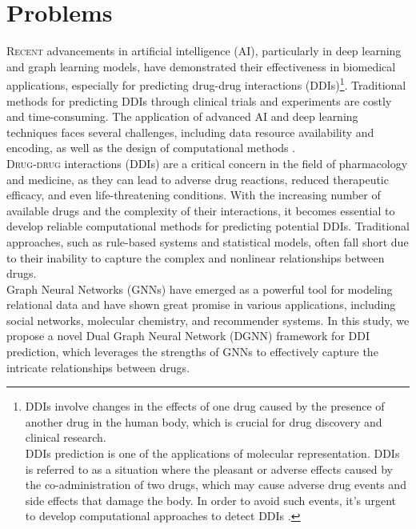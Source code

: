 \documentclass[12pt, a4paper,oneside]{book}
\begin{document}
\section{Problems}
\lettrine[lines=3, slope=0.6em, lhang=0.0, nindent=3pt]{R}{ecent}  advancements in artificial intelligence (AI), particularly in deep learning and graph learning models, have demonstrated their effectiveness in biomedical applications, especially for predicting drug-drug interactions (DDIs)\footnote{DDIs involve changes in the effects of one drug caused by the presence of another drug in the human body, which is crucial for drug discovery and clinical research.\\DDIs prediction is one of the applications of molecular representation. DDIs is
referred to as a situation where the pleasant or adverse effects caused by the co-administration
of two drugs, which may cause adverse drug events and side effects that damage the body. In order to avoid such events, it’s urgent to develop computational approaches to
detect DDIs \cite{DGNN-DDI}.}. Traditional methods for predicting DDIs through clinical trials and experiments are costly and time-consuming. The application of advanced AI and deep learning techniques faces several challenges, including data resource availability and encoding, as well as the design of computational methods \cite{survey}.  \\


\lettrine[lines=3, slope=0.6em, lhang=0.0, nindent=3pt]{D}{rug-drug} interactions (DDIs) are a critical concern in the field of pharmacology and medicine, as they can lead to adverse drug reactions, reduced therapeutic efficacy, and even life-threatening conditions. With the increasing number of available drugs and the complexity of their interactions, it becomes essential to develop reliable computational methods for predicting potential DDIs. Traditional approaches, such as rule-based systems and statistical models, often fall short due to their inability to capture the complex and nonlinear relationships between drugs.\\

Graph Neural Networks (GNNs) have emerged as a powerful tool for modeling relational data and have shown great promise in various applications, including social networks, molecular chemistry, and recommender systems. In this study, we propose a novel Dual Graph Neural Network (DGNN) framework for DDI prediction, which leverages the strengths of GNNs to effectively capture the intricate relationships between drugs.\\
\end{document}
